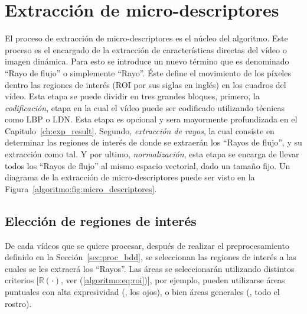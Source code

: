 \section{Extracción de micro-descriptores}
\label{sec:micro-descriptores}
	El proceso de extracción de micro-descriptores es el núcleo del algoritmo. Este proceso es el encargado de la extracción de características directas del vídeo o imagen dinámica. Para esto se introduce un nuevo término que es denominado ``Rayo de flujo'' o simplemente ``Rayo''. Éste define el movimiento de los píxeles dentro las regiones de interés (ROI por sus siglas en inglés) en los cuadros del vídeo. Esta etapa se puede dividir en tres grandes bloques, primero, la \emph{codificación}, etapa en la cual el vídeo puede ser codificado utilizando técnicas como LBP o LDN\@. Esta etapa es opcional y sera mayormente profundizada en el Capitulo~\ref{ch:exp_result}. Segundo, \emph{extracción de rayos}, la cual consiste en determinar las regiones de interés de donde se extraerán los ``Rayos de flujo'', y su extracción como tal. Y por ultimo, \emph{normalización}, esta etapa se encarga de llevar todos los ``Rayos de flujo'' al mismo espacio vectorial, dado un tamaño fijo. Un diagrama de la extracción de micro-descriptores puede ser visto en la Figura~\ref{algoritmo:fig:micro_descriptores}.


	\subsection{Elección de regiones de interés}
	\label{algoritmo:elecc_roi}
	De cada vídeos que se quiere procesar, después de realizar el preprocesamiento definido en la Sección~\ref{sec:proc_bdd}, se seleccionan las regiones de interés a las cuales se les extraerá los ``Rayos''. Las áreas se seleccionarán utilizando distintos criterios [$\mathds{R}(\cdot)$, ver (\ref{algoritmo:eq:roi})], por ejemplo, pueden utilizarse áreas puntuales con alta expresividad (\eg, los ojos), o bien áreas generales (\eg, todo el rostro).
	
